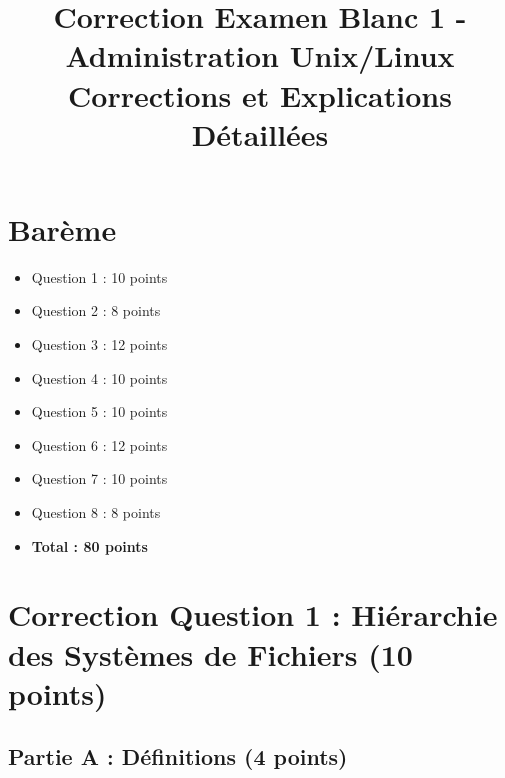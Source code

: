 \documentclass[12pt,a4paper]{article}
\title{\textbf{Correction Examen Blanc 1 - Administration Unix/Linux}\\
\large Corrections et Explications Détaillées}
\author{}
\date{}
\begin{document}
\maketitle
\thispagestyle{fancy}

\section*{Barème}
\begin{itemize}
    \item Question 1 : 10 points
    \item Question 2 : 8 points
    \item Question 3 : 12 points
    \item Question 4 : 10 points
    \item Question 5 : 10 points
    \item Question 6 : 12 points
    \item Question 7 : 10 points
    \item Question 8 : 8 points
    \item \textbf{Total : 80 points}
\end{itemize}

\newpage


\section{Correction Question 1 : Hiérarchie des Systèmes de Fichiers (10 points)}

\subsection*{Partie A : Définitions (4 points)}
\end{document}

